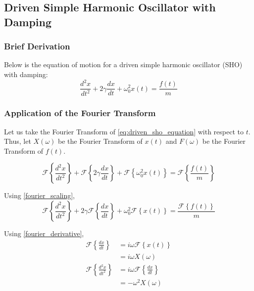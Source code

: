 \subsection{Driven Simple Harmonic Oscillator with Damping}

\subsubsection{Brief Derivation}
Below is the equation of motion for a driven simple harmonic oscillator (SHO) with damping:
\begin{equation} \label{eq:driven_sho_equation}
    \frac{d^2 x}{dt^2} + 2 \gamma \frac{dx}{dt} + \omega_0^2 x(t) = \frac{f(t)}{m}
\end{equation}

\subsubsection{Application of the Fourier Transform}
\noindent
Let us take the Fourier Transform of \cref{eq:driven_sho_equation} with respect to \(t\). Thus, let \(X(\omega)\) be the Fourier Transform of \(x(t)\) and \(F(\omega)\) be the Fourier Transform of \(f(t)\).

\begin{equation} 
    \mathcal{F} \left\{ \frac{d^2 x}{dt^2} \right\} + \mathcal{F} \left\{ 2 \gamma \frac{dx}{dt} \right\} + \mathcal{F} \left\{ \omega_0^2 x(t) \right\} = \mathcal{F} \left\{ \frac{f(t)}{m} \right\}
\end{equation}

\noindent
Using \cref{fourier_scaling},
\begin{equation} 
    \mathcal{F} \left\{ \frac{d^2 x}{dt^2} \right\} + 2 \gamma \mathcal{F} \left\{ \frac{dx}{dt} \right\} + \omega_0^2 \mathcal{F} \left\{ x(t) \right\} = \frac{\mathcal{F} \left\{ f(t) \right\}}{m} 
\end{equation}

\noindent
Using \cref{fourier_derivative},
\begin{align}
    \mathcal{F} \left\{ \frac{dx}{dt} \right\} &= i \omega \mathcal{F} \left\{ x(t) \right\} \\
    &= i \omega X(\omega) \\
    \mathcal{F} \left\{ \frac{d^2 x}{d t^2} \right\} & = i \omega \mathcal{F} \left\{ \frac{dx}{dt} \right\} \\
    & = -\omega^2 X(\omega)
\end{align}

